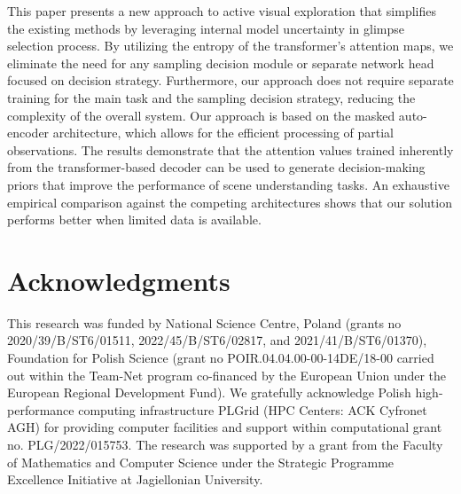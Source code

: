 \documentclass{article}
\begin{document}
This paper presents a new approach to active visual exploration that simplifies the existing methods by leveraging internal model uncertainty in glimpse selection process. By utilizing the entropy of the transformer's attention maps, we eliminate the need for any sampling decision module or separate network head focused on decision strategy. Furthermore, our approach does not require separate training for the main task and the sampling decision strategy, reducing the complexity of the overall system. Our approach is based on the masked auto-encoder architecture, which allows for the efficient processing of partial observations. The results demonstrate that the attention values trained inherently from the transformer-based decoder can be used to generate decision-making priors that improve the performance of scene understanding tasks. An exhaustive empirical comparison against the competing architectures shows that our solution performs better when limited data is available.



\appendix


\section*{Acknowledgments}

This research was funded by National Science Centre, Poland (grants no 2020/39/B/ST6/01511, 2022/45/B/ST6/02817, and 2021/41/B/ST6/01370), Foundation for Polish Science (grant no POIR.04.04.00-00-14DE/18-00 carried out within the Team-Net program co-financed by the European Union under the European Regional Development Fund). We gratefully acknowledge Polish high-performance computing infrastructure PLGrid (HPC Centers: ACK Cyfronet AGH) for providing computer facilities and support within computational grant no. PLG/2022/015753. The research was supported by a grant from the Faculty of Mathematics and Computer Science under the Strategic Programme Excellence Initiative at Jagiellonian University.



\end{document}
